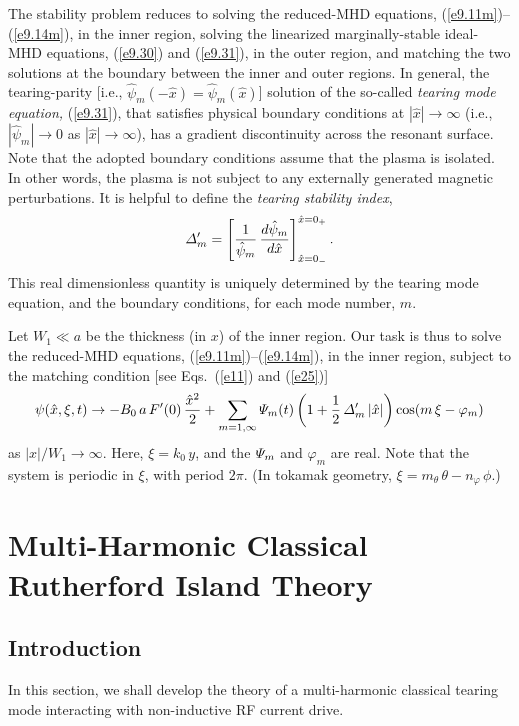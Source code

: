 \documentclass[12pt,prb,aps]{revtex4-1}
\begin{document}
The stability problem reduces to solving the  reduced-MHD equations, (\ref{e9.11m})--(\ref{e9.14m}), in the inner region, solving the linearized marginally-stable ideal-MHD
equations, (\ref{e9.30}) and (\ref{e9.31}), in the outer region, and matching the two solutions at the boundary between the
inner and outer regions.\cite{fkr} In general, the tearing-parity [i.e., $\hat{\psi}_m(-\hat{x})=\hat{\psi}_m(\hat{x})$] solution of the so-called {\em tearing mode equation,} (\ref{e9.31}), that satisfies
physical boundary conditions at $|\hat{x}|\rightarrow\infty$ (i.e., $|\hat{\psi}_m|\rightarrow 0$ as $|\hat{x}|\rightarrow \infty$), has a gradient discontinuity across the resonant surface.\cite{fkr} 
Note that the adopted boundary conditions assume that the plasma is isolated. In other words, the plasma is not subject to any externally generated magnetic perturbations. It is helpful to define the {\em tearing stability
index},\cite{fkr} 
\begin{equation}\label{e25}
{\mit\Delta}_m' =\left[\frac{1}{\hat{\psi}_m}\,\frac{d\hat{\psi}_m}{d\hat{x}}\right]_{\hat{x}=0_-}^{\hat{x}=0_+}.
\end{equation}
This real dimensionless quantity is uniquely determined by the tearing mode equation, and the boundary conditions,
for each mode number, $m$. 

Let $W_1\ll a$ be the thickness (in $x$) of the inner region. Our task is thus to solve the   reduced-MHD equations, (\ref{e9.11m})--(\ref{e9.14m}), in the inner region,  subject to the matching 
condition [see Eqs.~(\ref{e11}) and (\ref{e25})]
\begin{equation}\label{e26}
\psi(\hat{x},\xi,t) \rightarrow -B_0\,a\,F'(0)\,\frac{\hat{x}^2}{2} +\sum_{m=1,\infty}
{\mit\Psi}_m(t)\left(1+\frac{1}{2}\,{\mit\Delta}_m'\,|\hat{x}|\right)\cos(m\,\xi-\varphi_m)
\end{equation}
as $|x|/W_1\rightarrow\infty$. Here, $\xi=k_0\,y$, and the ${\mit\Psi}_m$ and $\varphi_m$ are real. Note that the
system is periodic in $\xi$, with period $2\pi$. (In tokamak geometry, $\xi=m_\theta\,\theta-n_\varphi\,\phi$.) 

\section{Multi-Harmonic Classical Rutherford Island Theory}
\subsection{Introduction}
In this section, we shall develop the theory of a multi-harmonic classical tearing mode interacting with non-inductive RF current drive. 
\end{document}
